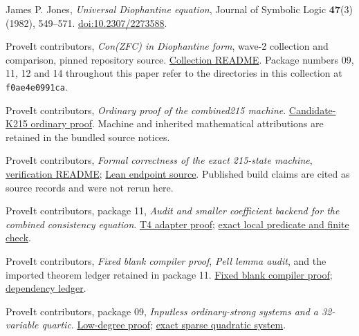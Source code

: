 \documentclass[11pt,a4paper]{article}
\theoremstyle{remark}
\newcommand{\repofile}[2]{\href{https://github.com/VladimirReshetnikov/ProveIt/blob/f0ae4e0991ca44a7bb4e5671d42e33d775e48035/#1}{#2}}
\begin{document}
\begin{thebibliography}{99}
James P. Jones, \emph{Universal Diophantine equation},
Journal of Symbolic Logic \textbf{47}(3) (1982), 549--571.
\href{https://doi.org/10.2307/2273588}{doi:10.2307/2273588}.

ProveIt contributors, \emph{Con(ZFC) in Diophantine form}, wave-2
collection and comparison, pinned repository source.
\repofile{SetTheory/Cardinals/docs/reports/hilbert-tenth-problem/con-zfc-diophantine-forms/README.md}{Collection README}.
Package numbers 09, 11, 12 and 14 throughout this paper refer to the
directories in this collection at \texttt{f0ae4e0991ca}.

ProveIt contributors, \emph{Ordinary proof of the combined215 machine}.
\repofile{Computability/BusyBeaver/Research/ZFC/candidate-k215/proof.md}{Candidate-K215 ordinary proof}.
Machine and inherited mathematical attributions are retained in the
bundled source notices.

ProveIt contributors, \emph{Formal correctness of the exact 215-state machine},
\repofile{Computability/BusyBeaver/Research/ZFC/k225-formal/verification/k215/README.md}{verification README};
\repofile{Computability/BusyBeaver/Lean/BusyBeaver/ZFC/KEndpoint215.lean}{Lean endpoint source}.
Published build claims are cited as source records and were not rerun here.

ProveIt contributors, package 11, \emph{Audit and smaller coefficient backend
for the combined consistency equation}.
\repofile{SetTheory/Cardinals/docs/reports/hilbert-tenth-problem/con-zfc-diophantine-forms/11-t4/bridge/BRIDGE_AUDIT.md}{T4 adapter proof};
\repofile{SetTheory/Cardinals/docs/reports/hilbert-tenth-problem/con-zfc-diophantine-forms/11-t4/bridge/check_t4.py}{exact local predicate and finite check}.

ProveIt contributors, \emph{Fixed blank compiler proof}, \emph{Pell lemma audit},
and the imported theorem ledger retained in package 11.
\repofile{SetTheory/Cardinals/docs/reports/hilbert-tenth-problem/con-zfc-diophantine-forms/12-gap-norm14/upstream/fixed_blank_67_proof.md}{Fixed blank compiler proof};
\repofile{SetTheory/Cardinals/docs/reports/hilbert-tenth-problem/con-zfc-diophantine-forms/11-t4/bridge/sources/proof_dependencies.json}{dependency ledger}.

ProveIt contributors, package 09, \emph{Inputless ordinary-strong systems
and a 32-variable quartic}.
\repofile{SetTheory/Cardinals/docs/reports/hilbert-tenth-problem/con-zfc-diophantine-forms/09-combined13/proofs/LOW_DEGREE_PROOF.md}{Low-degree proof};
\repofile{SetTheory/Cardinals/docs/reports/hilbert-tenth-problem/con-zfc-diophantine-forms/09-combined13/low_degree/quartic32.json}{exact sparse quadratic system}.


\end{thebibliography}
\end{document}
